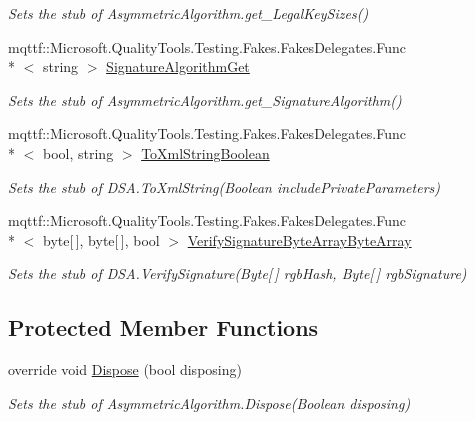\begin{DoxyCompactItemize}
\begin{DoxyCompactList}\small\item\em Sets the stub of Asymmetric\-Algorithm.\-get\-\_\-\-Legal\-Key\-Sizes()\end{DoxyCompactList}\item 
mqttf\-::\-Microsoft.\-Quality\-Tools.\-Testing.\-Fakes.\-Fakes\-Delegates.\-Func\\*
$<$ string $>$ \hyperlink{class_system_1_1_security_1_1_cryptography_1_1_fakes_1_1_stub_d_s_a_a43a528c6ab7bff7d65a1d71c4a8f0250}{Signature\-Algorithm\-Get}
\begin{DoxyCompactList}\small\item\em Sets the stub of Asymmetric\-Algorithm.\-get\-\_\-\-Signature\-Algorithm()\end{DoxyCompactList}\item 
mqttf\-::\-Microsoft.\-Quality\-Tools.\-Testing.\-Fakes.\-Fakes\-Delegates.\-Func\\*
$<$ bool, string $>$ \hyperlink{class_system_1_1_security_1_1_cryptography_1_1_fakes_1_1_stub_d_s_a_a49718865b58e9938147904fe2f167ca7}{To\-Xml\-String\-Boolean}
\begin{DoxyCompactList}\small\item\em Sets the stub of D\-S\-A.\-To\-Xml\-String(\-Boolean include\-Private\-Parameters)\end{DoxyCompactList}\item 
mqttf\-::\-Microsoft.\-Quality\-Tools.\-Testing.\-Fakes.\-Fakes\-Delegates.\-Func\\*
$<$ byte\mbox{[}$\,$\mbox{]}, byte\mbox{[}$\,$\mbox{]}, bool $>$ \hyperlink{class_system_1_1_security_1_1_cryptography_1_1_fakes_1_1_stub_d_s_a_acf7c97d2a4a26394ae02415aeff84688}{Verify\-Signature\-Byte\-Array\-Byte\-Array}
\begin{DoxyCompactList}\small\item\em Sets the stub of D\-S\-A.\-Verify\-Signature(\-Byte\mbox{[}$\,$\mbox{]} rgb\-Hash, Byte\mbox{[}$\,$\mbox{]} rgb\-Signature)\end{DoxyCompactList}\end{DoxyCompactItemize}
\subsection*{Protected Member Functions}
\begin{DoxyCompactItemize}
\item 
override void \hyperlink{class_system_1_1_security_1_1_cryptography_1_1_fakes_1_1_stub_d_s_a_a0f1b94629ef42d483d82c2aab2c52601}{Dispose} (bool disposing)
\begin{DoxyCompactList}\small\item\em Sets the stub of Asymmetric\-Algorithm.\-Dispose(\-Boolean disposing)\end{DoxyCompactList}\end{DoxyCompactItemize}
